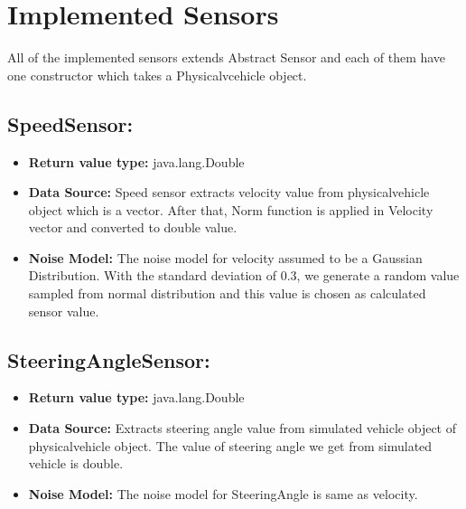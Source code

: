 \documentclass[]{article}
\begin{document}
\section{Implemented Sensors}
All of the implemented sensors extends Abstract Sensor and each of them have one constructor which takes a Physicalvcehicle object.

    \subsection{SpeedSensor:}
    \begin{itemize}
        \item \textbf{Return value type:} java.lang.Double
        \item \textbf{Data Source:} Speed sensor extracts velocity value from physicalvehicle object which is a vector. After that, Norm\cite{Norm} function is applied in Velocity vector and converted to double value.
        \item \textbf{Noise Model:} The noise model for velocity assumed to be a Gaussian Distribution. With the standard deviation of 0.3, we generate a random value sampled from normal distribution and this value is chosen as calculated sensor value.
    \end{itemize}

    \subsection{SteeringAngleSensor:}
        \begin{itemize}
        \item \textbf{Return value type:} java.lang.Double
        \item \textbf{Data Source:} Extracts steering angle value from simulated vehicle object of physicalvehicle object. The value of steering angle we get from simulated vehicle is double.
        \item \textbf{Noise Model:} The noise model for SteeringAngle is same as velocity.
        \end{itemize}
\end{document}
